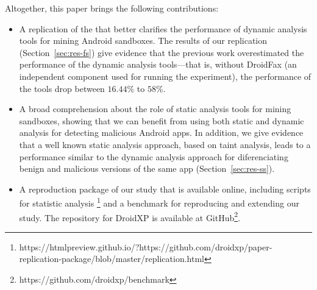 Altogether, this paper brings the following contributions:

\begin{itemize}
\item A replication of the \blls that better clarifies the performance of
  dynamic analysis tools for mining Android sandboxes. The results of
  our replication (Section~\ref{sec:res-fs})
  give evidence that the previous work overestimated
  the performance of the dynamic analysis tools---that is, without
  DroidFax (an independent component used for running the
  \blls experiment), the performance of the tools drop between $16.44$\% to $58$\%. 

\item A broad comprehension about the role of static analysis tools for mining
  sandboxes, showing that we can benefit from using both static and dynamic
  analysis for detecting malicious Android apps. In addition,
  we give evidence that a well known static analysis approach, based on
  taint analysis, leads to a performance similar to the dynamic analysis
  approach for diferenciating benign and malicious versions of the same
  app (Section~\ref{sec:res-ss}).

\item A reproduction package of our study that is available online, including
  scripts for statistic analysis \footnote{https://htmlpreview.github.io/?https://github.com/droidxp/paper-replication-package/blob/master/replication.html}
  and a benchmark for reproducing and extending our study. The repository for DroidXP is available
at GitHub\footnote{https://github.com/droidxp/benchmark}.
 
\end{itemize}
